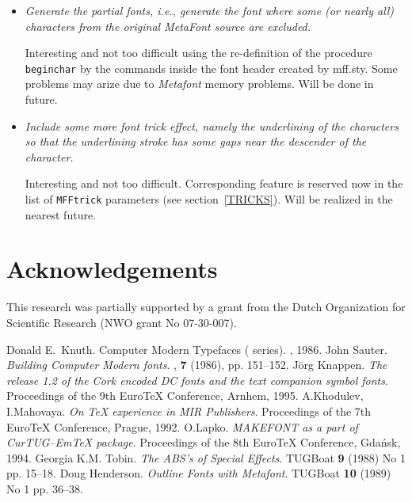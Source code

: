 \begin{itemize}
\item {\em Generate the partial fonts, i.e., generate the font where
       some (or nearly all) characters from the original MetaFont source
       are excluded.}

       Interesting and not too difficult using the re-definition
       of the procedure {\tt beginchar} by the commands
       inside the font header created by {\sc mff.sty}.
       Some problems may arize due to {\sl Metafont}
       memory problems. Will be done in future.

\item {\em Include some more {\sl font trick} effect, namely the
      underlining of the characters so that the underlining stroke
      has some gaps near the descender of the character.}

      Interesting and not too difficult. Corresponding feature
      is reserved now in the list of {\tt\bs{}MFFtrick} parameters
      (see section~\ref{TRICKS}).
      Will be realized in the nearest future.

\end{itemize}


\section*{Acknowledgements}

This research was partially supported by a grant
from the Dutch Organization for Scientific Research
(NWO grant No 07-30-007).


\begin{thebibliography}{00}
 Donald E.\ Knuth. Computer Modern Typefaces
(\CandT{} series). \AW, 1986.
 John Sauter. {\em Building Computer Modern fonts}.
\TUB, {\bf 7} (1986), pp. 151--152.
 J\"org Knappen. {\em The release 1.2 of the Cork
encoded DC fonts and the text companion symbol fonts}.
  Proceedings of the 9th Euro\TeX{} Conference, Arnhem, 1995.
 A.Khodulev, I.Mahovaya.
{\em On \TeX{} experience in MIR Publishers}.
  Proceedings of the 7th Euro\TeX{} Conference, Prague, 1992.
 O.Lapko.
  {\em  MAKEFONT as a part of CurTUG--Em\TeX{} package}.
  Proceedings of the 8th Euro\TeX{} Conference, Gda\'nsk, 1994.
 Georgia K.M. Tobin.
      {\em The ABS's of Special Effects}.
      TUGBoat {\bf 9} (1988) No 1 pp. 15--18.
 Doug Henderson.
      {\em Outline Fonts with Metafont}.
      TUGBoat {\bf 10} (1989) No 1 pp. 36--38.
\end{thebibliography}



